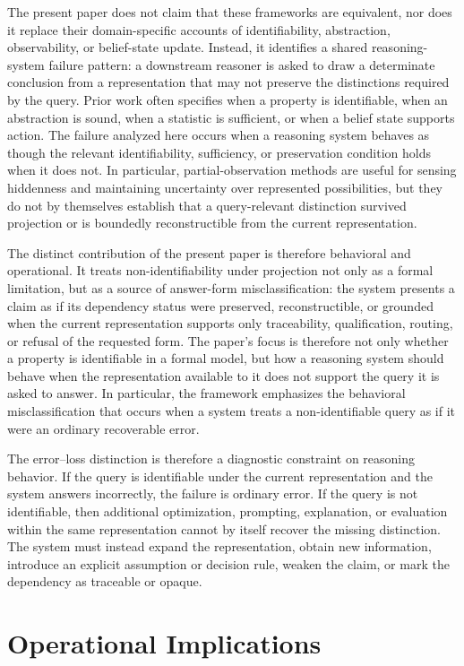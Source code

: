 \documentclass[11pt]{article}
\begin{document}
The present paper does not claim that these frameworks are equivalent, nor does it replace their domain-specific accounts of identifiability, abstraction, observability, or belief-state update. Instead, it identifies a shared reasoning-system failure pattern: a downstream reasoner is asked to draw a determinate conclusion from a representation that may not preserve the distinctions required by the query. Prior work often specifies when a property is identifiable, when an abstraction is sound, when a statistic is sufficient, or when a belief state supports action. The failure analyzed here occurs when a reasoning system behaves as though the relevant identifiability, sufficiency, or preservation condition holds when it does not. In particular, partial-observation methods are useful for sensing hiddenness and maintaining uncertainty over represented possibilities, but they do not by themselves establish that a query-relevant distinction survived projection or is boundedly reconstructible from the current representation.

The distinct contribution of the present paper is therefore behavioral and operational. It treats non-identifiability under projection not only as a formal limitation, but as a source of answer-form misclassification: the system presents a claim as if its dependency status were preserved, reconstructible, or grounded when the current representation supports only traceability, qualification, routing, or refusal of the requested form. The paper's focus is therefore not only whether a property is identifiable in a formal model, but how a reasoning system should behave when the representation available to it does not support the query it is asked to answer. In particular, the framework emphasizes the behavioral misclassification that occurs when a system treats a non-identifiable query as if it were an ordinary recoverable error.

The error--loss distinction is therefore a diagnostic constraint on reasoning behavior. If the query is identifiable under the current representation and the system answers incorrectly, the failure is ordinary error. If the query is not identifiable, then additional optimization, prompting, explanation, or evaluation within the same representation cannot by itself recover the missing distinction. The system must instead expand the representation, obtain new information, introduce an explicit assumption or decision rule, weaken the claim, or mark the dependency as traceable or opaque.

\section{Operational Implications}
\end{document}
